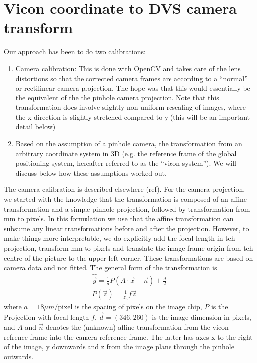 \documentclass{article}
\begin{document}
\section{Vicon coordinate to DVS camera transform}
Our approach has been to do two calibrations:
\begin{enumerate}
\item Camera calibration: This is done with OpenCV and takes care of the lens distortions so that the corrected camera frames are according to a ``normal'' or rectilinear camera projection. The hope was that this would essentially be the equivalent of the the pinhole camera projection. Note that this transformation does involve slightly non-uniform rescaling of images, where the x-direction is slightly stretched compared to y (this will be an important detail below)
\item Based on the assumption of a pinhole camera, the transformation from an arbitrary coordinate system in 3D (e.g. the reference frame of the global positioning system, hereafter referred to as the ``vicon system''). We will discuss below how these assumptions worked out.
\end{enumerate}

The camera calibration is described elsewhere (ref).
For the camera projection, we started with the knowledge that the transformation is composed of an affine transformation and a simple pinhole projection, followed by transformation from mm to pixels. In this formulation we use that the affine transformation can subsume any linear transformations before and after the projection. However, to make things more interpretable, we do explicitly add the focal length in teh projection, transform mm to pixels and translate the image frame origin from teh centre of the picture to the upper left corner. These transformations are based on camera data and not fitted.
The general form of the transformation is
\begin{align}
  \hat{\vec{y}} = \frac{1}{a} P(A\cdot \vec{x} + \vec{n}) + \frac{d}{2} \\
  P(\vec{z})= \frac{1}{z_3}f \vec{z}  
\end{align}
where $a= 18 \mu m/\text{pixel}$ is the spacing of pixels on the image chip, $P$ is the Projection with focal length $f$, $\vec{d}= (346, 260)$ is the image dimension in pixels, and $A$ and $\vec{n}$ denotes the (unknown) affine transformation from the vicon refrence frame into the camera reference frame. The latter has axes x to the right of the image, y downwards and z from the image plane through the pinhole outwards.
\end{document}
